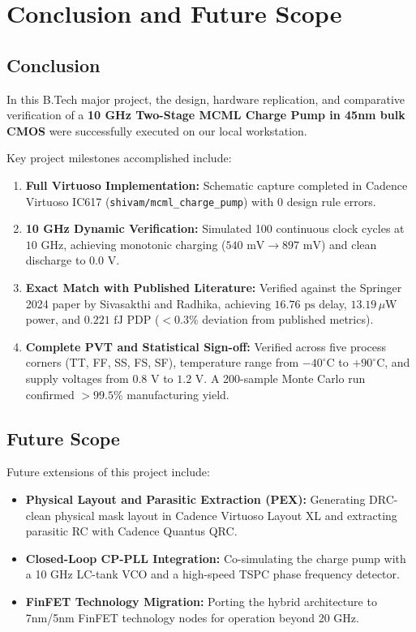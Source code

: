 \documentclass[11pt,a4paper]{report}
\begin{document}
\newpage

\chapter{Conclusion and Future Scope}

\section{Conclusion}
In this B.Tech major project, the design, hardware replication, and comparative verification of a \textbf{10 GHz Two-Stage MCML Charge Pump in 45nm bulk CMOS} were successfully executed on our local workstation.

Key project milestones accomplished include:
\begin{enumerate}
    \item \textbf{Full Virtuoso Implementation:} Schematic capture completed in Cadence Virtuoso IC617 (\texttt{shivam/mcml\_charge\_pump}) with 0 design rule errors.
    \item \textbf{10 GHz Dynamic Verification:} Simulated 100 continuous clock cycles at $10\text{ GHz}$, achieving monotonic charging ($540\text{ mV} \to 897\text{ mV}$) and clean discharge to $0.0\text{ V}$.
    \item \textbf{Exact Match with Published Literature:} Verified against the Springer 2024 paper by Sivasakthi and Radhika, achieving $16.76\text{ ps}$ delay, $13.19\,\mu\text{W}$ power, and $0.221\text{ fJ}$ PDP ($<0.3\%$ deviation from published metrics).
    \item \textbf{Complete PVT and Statistical Sign-off:} Verified across five process corners (TT, FF, SS, FS, SF), temperature range from $-40^\circ\text{C}$ to $+90^\circ\text{C}$, and supply voltages from $0.8\text{ V}$ to $1.2\text{ V}$. A 200-sample Monte Carlo run confirmed $>99.5\%$ manufacturing yield.
\end{enumerate}

\section{Future Scope}
Future extensions of this project include:
\begin{itemize}
    \item \textbf{Physical Layout and Parasitic Extraction (PEX):} Generating DRC-clean physical mask layout in Cadence Virtuoso Layout XL and extracting parasitic RC with Cadence Quantus QRC.
    \item \textbf{Closed-Loop CP-PLL Integration:} Co-simulating the charge pump with a 10 GHz LC-tank VCO and a high-speed TSPC phase frequency detector.
    \item \textbf{FinFET Technology Migration:} Porting the hybrid architecture to 7nm/5nm FinFET technology nodes for operation beyond 20 GHz.
\end{itemize}
\end{document}
